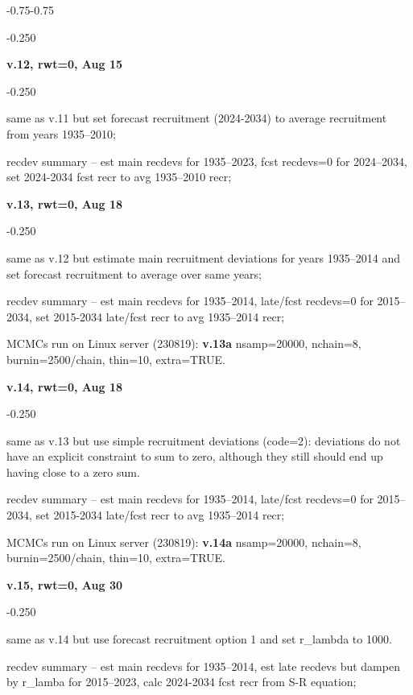 \begin{itemize_csas}{-0.75}{-0.75}
\begin{itemize_csas}{-0.25}{0}
	\end{itemize_csas}
	\item \textbf{v.12, rwt=0, Aug 15}
	\begin{itemize_csas}{-0.25}{0}
		\item same as v.11 but set forecast recruitment (2024-2034) to average recruitment from years 1935--2010;
		\item recdev summary -- est main recdevs for 1935--2023, fcst recdevs=0 for 2024--2034, set 2024-2034 fcst recr to avg 1935--2010 recr;
	\end{itemize_csas}
	\item \textbf{v.13, rwt=0, Aug 18}
	\begin{itemize_csas}{-0.25}{0}
		\item same as v.12 but estimate main recruitment deviations for years 1935--2014 and set forecast recruitment to average over same years;
		\item recdev summary -- est main recdevs for 1935--2014, late/fcst recdevs=0 for 2015--2034, set 2015-2034 late/fcst recr to avg 1935--2014 recr;
		\item MCMCs run on Linux server (230819): \textbf{v.13a} nsamp=20000, nchain=8, burnin=2500/chain, thin=10, extra=TRUE.
	\end{itemize_csas}
	\item \textbf{v.14, rwt=0, Aug 18}
	\begin{itemize_csas}{-0.25}{0}
		\item same as v.13 but use simple recruitment deviations (code=2): deviations do not have an explicit constraint to sum to zero, although they still should end up having close to a zero sum.
		\item recdev summary -- est main recdevs for 1935--2014, late/fcst recdevs=0 for 2015--2034, set 2015-2034 late/fcst recr to avg 1935--2014 recr;
		\item MCMCs run on Linux server (230819): \textbf{v.14a} nsamp=20000, nchain=8, burnin=2500/chain, thin=10, extra=TRUE.
	\end{itemize_csas}
	\item \textbf{v.15, rwt=0, Aug 30}
	\begin{itemize_csas}{-0.25}{0}
		\item same as v.14 but use forecast recruitment option 1 and set r\_lambda to 1000.
		\item recdev summary -- est main recdevs for 1935--2014, est late recdevs but dampen by r\_lamba for 2015--2023, calc 2024-2034 fcst recr from S-R equation;

\end{itemize_csas}
\end{itemize_csas}
